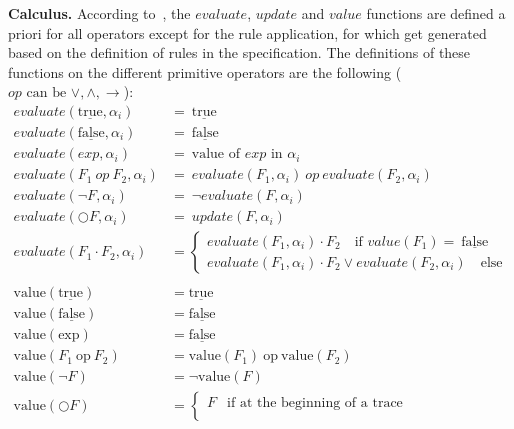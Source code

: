 \documentclass[english]{article}
\begin{document}
\textbf{Calculus.} According to~\cite{barringer2004rule}, the $evaluate$, $update$ and $value$ functions are defined a priori for all operators except for the
rule application, for which get generated based on the definition of rules in the specification. The definitions of these functions on the different primitive operators are the following ($op\text{ can be }\lor , \land, \rightarrow $):
{\allowdisplaybreaks
\begin{align*}
    evaluate(\underline{\text{true}},\alpha_i) & =\ \underline{\text{true}} \\
    evaluate(\underline{\text{false}},\alpha_i) & =\ \underline{\text{false}} \\ 
    evaluate(exp,\alpha_i) & =\ \text{value of } exp\text{ in } \alpha_i \\
    evaluate(F_1\ op\ F_2,\alpha_i) & =\  evaluate(F_1,\alpha_i)\ op\ evaluate(F_2,\alpha_i)\\
    evaluate(\neg{F},\alpha_i) & =\ \neg{evaluate(F,\alpha_i)}  \\
    evaluate(\bigcirc F,\alpha_i) & =\ update(F,\alpha_i)  \\
    evaluate(F_1 \cdot F_2,\alpha_i) & =
    \begin{cases}
        evaluate(F_1,\alpha_i)\cdot F_2 \quad \text{if } value(F_1)=\ \underline{\text{false}} \\
        evaluate(F_1,\alpha_i)\cdot F_2 \lor evaluate(F_2,\alpha_i)\quad \text{else} 
    \end{cases} \\ \\
        \text{value}(\underline{\text{true}}) & = \underline{\text{true}} \\
        \text{value}(\underline{\text{false}}) & = \underline{\text{false}} \\ 
        \text{value}(\text{exp}) & = \underline{\text{false}} \\
        \text{value}(F_1\ \text{op}\ F_2) & = \text{value}(F_1)\ \text{op}\ \text{value}(F_2) \\
        \text{value}(\neg{F}) & = \neg{\text{value}(F)}  \\
        \text{value}(\bigcirc F) & =
        \begin{cases}
            F & \text{if at the beginning of a trace} \\

\end{cases}
\end{align*}}
\end{document}
